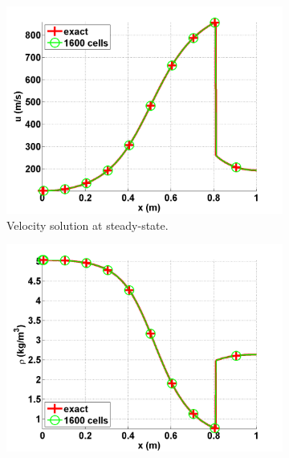 \begin{figure}[H]
        \centering
        \begin{subfigure}[b]{0.495\textwidth}
                \centering
                \includegraphics[scale=.50]{figures/vapor_velocity_numerical_and_exact_1600.png}
                \caption{Velocity solution at steady-state.}
                \label{fig:1d_nozzle_vap_vel}
        \end{subfigure}%
        \begin{subfigure}[b]{0.495\textwidth}
                \centering
                \includegraphics[scale=.50]{figures/vapor_density_numerical_and_exact_1600.png}

\end{subfigure}
\end{figure}
